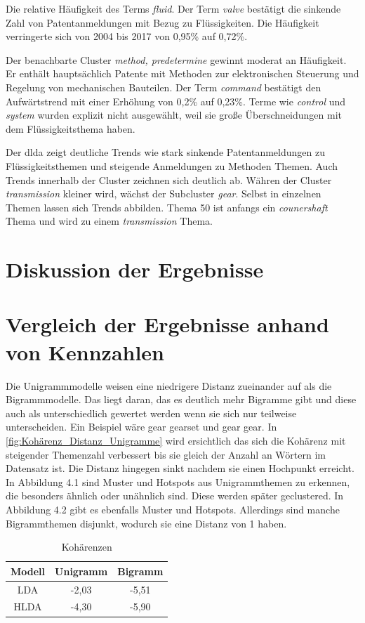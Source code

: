 Die relative Häufigkeit des Terms \emph{fluid}. Der Term \emph{valve} bestätigt die sinkende Zahl von Patentanmeldungen mit Bezug zu Flüssigkeiten. Die Häufigkeit verringerte sich von 2004 bis 2017 von 0,95\% auf 0,72\%.


Der benachbarte Cluster \emph{method, predetermine} gewinnt moderat an Häufigkeit. Er enthält hauptsächlich Patente mit Methoden zur elektronischen Steuerung und Regelung von mechanischen Bauteilen. Der Term \emph{command} bestätigt den Aufwärtstrend mit einer Erhöhung von 0,2\% auf 0,23\%. Terme wie \emph{control} und \emph{system} wurden explizit nicht ausgewählt, weil sie große Überschneidungen mit dem Flüssigkeitsthema haben.


Der \gls{dlda} zeigt deutliche Trends wie stark sinkende Patentanmeldungen zu Flüssigkeitsthemen und steigende Anmeldungen zu Methoden Themen. Auch Trends innerhalb der Cluster zeichnen sich deutlich ab. Währen der Cluster \emph{transmission} kleiner wird, wächst der Subcluster \emph{gear}. Selbst in einzelnen Themen lassen sich Trends abbilden. Thema 50 ist anfangs ein \emph{counershaft} Thema und wird zu einem \emph{transmission} Thema.

\section{Diskussion der Ergebnisse}

\section{Vergleich der Ergebnisse anhand von Kennzahlen}
Die Unigrammmodelle weisen eine niedrigere Distanz zueinander auf als die Bigrammmodelle. Das liegt daran, das es deutlich mehr Bigramme gibt und diese auch als unterschiedlich gewertet werden wenn sie sich nur teilweise unterscheiden. Ein Beispiel wäre gear gearset und gear gear. In \ref{fig:Kohärenz_Distanz_Unigramme} wird ersichtlich das sich die Kohärenz mit steigender Themenzahl verbessert bis sie gleich der Anzahl an Wörtern im Datensatz ist. Die Distanz hingegen sinkt nachdem sie einen Hochpunkt erreicht. In Abbildung 4.1 sind Muster und Hotspots aus Unigrammthemen zu erkennen, die besonders ähnlich oder unähnlich sind. Diese werden später geclustered. In Abbildung 4.2 gibt es ebenfalls Muster und Hotspots. Allerdings sind manche Bigrammthemen disjunkt, wodurch sie eine Distanz von 1 haben. 

\begin{table}
	\RawFloats
	\centering
	\caption{Kohärenzen}
	\begin{tabular}{|c|c|c|}
		\hline
		Modell & Unigramm & Bigramm \\
		\hline
		LDA & -2,03 & -5,51 \\
		\hline
		HLDA & -4,30 & -5,90 \\
		\hline
	\end{tabular}
	\label{table:Kohärenzen}
\end{table} 

